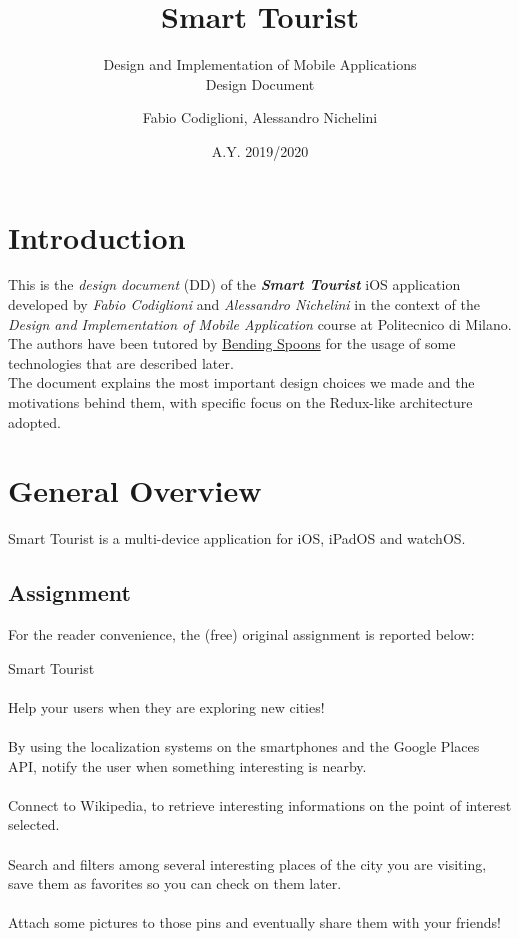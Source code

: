 \documentclass[a4paper, 11pt, parskip=half]{scrreprt}
\title{Smart Tourist}
\subtitle{Design and Implementation of Mobile Applications\\Design Document}
\date{A.Y. 2019/2020}
\author{Fabio Codiglioni, Alessandro Nichelini}
\theoremstyle{definition}
\newenvironment{warn}[1][Warning:]{ %
	\medskip
	\begin{mdframed}[style=warning]
		\noindent{\textbf{#1}}
}{
	\end{mdframed}
}
\begin{document}
\maketitle
\tableofcontents
\newpage
{}



\chapter{Introduction}

This is the \textit{design document} (DD) of the \textbf{\textit{Smart Tourist}} iOS application developed by \textit{Fabio Codiglioni} and \textit{Alessandro Nichelini} in the context of the \textit{Design and Implementation of Mobile Application} course at Politecnico di Milano. The authors have been tutored by \underline{Bending Spoons} for the usage of some technologies that are described later.\\
The document explains the most important design choices we made and the motivations behind them, with specific focus on the Redux-like architecture adopted.




\chapter{General Overview}

Smart Tourist is a multi-device application for iOS, iPadOS and watchOS.

\section{Assignment}
For the reader convenience, the (free) original assignment is reported below:
\begin{warn}[Assignment:]
	 Smart Tourist
	 \\\\Help your users when they are exploring new cities!
	 \\\\By using the localization systems on the smartphones and the Google Places API, notify the user when something interesting is nearby.
	 \\\\Connect to Wikipedia, to retrieve interesting informations on the point of interest selected.
	 \\\\Search and filters among several interesting places of the city you are visiting, save them as favorites so you can check on them later.
	 \\\\Attach some pictures to those pins and eventually share them with your friends!
\end{warn}
\end{document}
